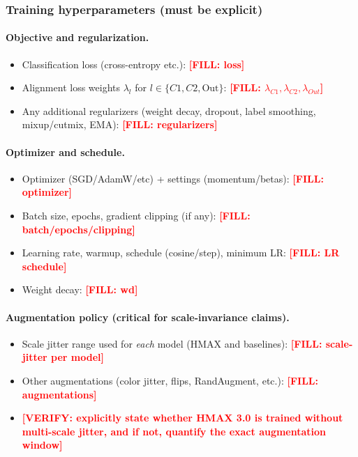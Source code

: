 \documentclass[pdflatex,sn-nature]{sn-jnl}
\newcommand{\FILL}[1]{\textcolor{red}{\textbf{[FILL: #1]}}}
\newcommand{\VERIFY}[1]{\textcolor{red}{\textbf{[VERIFY: #1]}}}
\begin{document}
\subsubsection*{Training hyperparameters (must be explicit)}
\paragraph{Objective and regularization.}
\begin{itemize}
    \item Classification loss (cross-entropy etc.): \FILL{loss}
    \item Alignment loss weights $\lambda_l$ for $l\in\{C1,C2,\text{Out}\}$: \FILL{$\lambda_{C1},\lambda_{C2},\lambda_{Out}$}
    \item Any additional regularizers (weight decay, dropout, label smoothing, mixup/cutmix, EMA): \FILL{regularizers}
\end{itemize}

\paragraph{Optimizer and schedule.}
\begin{itemize}
    \item Optimizer (SGD/AdamW/etc) + settings (momentum/betas): \FILL{optimizer}
    \item Batch size, epochs, gradient clipping (if any): \FILL{batch/epochs/clipping}
    \item Learning rate, warmup, schedule (cosine/step), minimum LR: \FILL{LR schedule}
    \item Weight decay: \FILL{wd}
\end{itemize}

\paragraph{Augmentation policy (critical for scale-invariance claims).}
\begin{itemize}
    \item Scale jitter range used for \emph{each} model (HMAX and baselines): \FILL{scale-jitter per model}
    \item Other augmentations (color jitter, flips, RandAugment, etc.): \FILL{augmentations}
    \item \VERIFY{explicitly state whether HMAX 3.0 is trained without multi-scale jitter, and if not, quantify the exact augmentation window}
\end{itemize}
\end{document}
